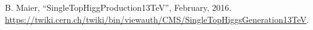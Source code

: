 \documentclass[print]{nuthesis}
\begin{document}
\begin{thebibliography}{300}
  

B. Maier, ``SingleTopHiggProduction13TeV'', February, 2016. \url{https://twiki.cern.ch/twiki/bin/viewauth/CMS/SingleTopHiggsGeneration13TeV}.

  
\end{thebibliography}
  
%
%
\end{document}

